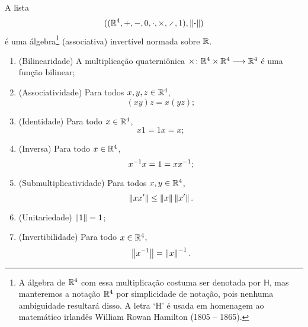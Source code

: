 \begin{proposition}
A lista
	\begin{equation*}
	((\R^4,+,-,0,\cdot,\times,\div,1),\nor{\var})
	\end{equation*}
é uma álgebra\footnote{A álgebra de $\mathbb{R}^4$ com essa multiplicação costuma ser denotada por $\mathbb{H}$, mas manteremos a notação $\mathbb{R}^4$ por simplicidade de notação, pois nenhuma ambiguidade resultará disso. A letra `H' é usada em homenagem ao matemático irlandês William Rowan Hamilton (1805 -- 1865).} (associativa) invertível normada sobre $\mathbb{R}$.
\begin{enumerate}
	\item (Bilinearidade) A multiplicação quaterniônica ${\times}\colon {\mathbb{R}^4 \times \mathbb{R}^4} \longrightarrow {\mathbb{R}^4}$ é uma função bilinear;
	\item (Associatividade) Para todos $x,y,z \in \mathbb{R}^4$,
		\begin{equation*}
		(xy)z = x(yz);
		\end{equation*}
	\item (Identidade) Para todo $x \in \mathbb{R}^4$,
		\begin{equation*}
		x1 = 1x = x;
		\end{equation*}
	\item (Inversa) Para todo $x \in \mathbb{R}^4$,
		\begin{equation*}
		x^{-1} x = 1 = xx^{-1};
		\end{equation*}
	\item (Submultiplicatividade) Para todos $x,y \in \mathbb{R}^4$,
		\begin{equation*}
		\left\Vert{xx'}\right\Vert \leq \left\Vert{x}\right\Vert\left\Vert{x'}\right\Vert.
		\end{equation*}
	\item (Unitariedade) $\left\Vert{1}\right\Vert=1$;
	\item (Invertibilidade) Para todo $x \in \mathbb{R}^4$,
		\begin{equation*}
		\left\Vert{x^{-1}}\right\Vert = \left\Vert{x}\right\Vert^{-1}.
		\end{equation*}
\end{enumerate}
\end{proposition}
